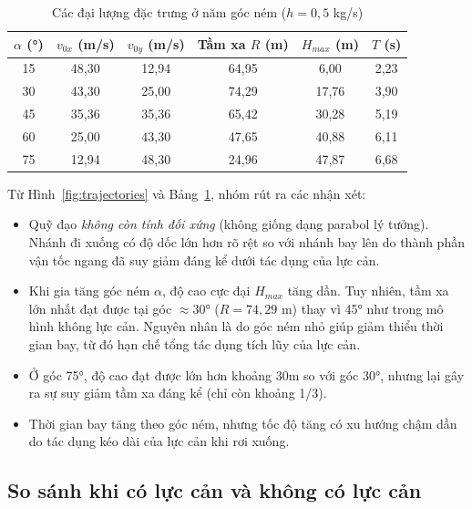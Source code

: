 \begin{table}[H]
\centering
\caption{Các đại lượng đặc trưng ở năm góc ném ($h = 0{,}5$ kg/s)}
\label{tab:data}
\begin{tabular}{|c|c|c|c|c|c|}
\hline
$\alpha$ (°) & $v_{0x}$ (m/s) & $v_{0y}$ (m/s) & Tầm xa $R$ (m) & $H_{max}$ (m) & $T$ (s) \\
\hline
15 & 48{,}30 & 12{,}94 & 64{,}95 & 6{,}00 & 2{,}23 \\
30 & 43{,}30 & 25{,}00 & 74{,}29 & 17{,}76 & 3{,}90 \\
45 & 35{,}36 & 35{,}36 & 65{,}42 & 30{,}28 & 5{,}19 \\
60 & 25{,}00 & 43{,}30 & 47{,}65 & 40{,}88 & 6{,}11 \\
75 & 12{,}94 & 48{,}30 & 24{,}96 & 47{,}87 & 6{,}68 \\
\hline
\end{tabular}
\end{table}

Từ Hình~\ref{fig:trajectories} và Bảng~\ref{tab:data}, nhóm rút ra các nhận xét:

\begin{itemize}
    \item Quỹ đạo \textit{không còn tính đối xứng} (không giống dạng parabol lý tưởng). Nhánh đi xuống có độ dốc lớn hơn rõ rệt so với nhánh bay lên do thành phần vận tốc ngang đã suy giảm đáng kể dưới tác dụng của lực cản.
    
    \item Khi gia tăng góc ném $\alpha$, độ cao cực đại $H_{max}$ tăng dần. Tuy nhiên, tầm xa lớn nhất đạt được tại góc $\approx 30°$ ($R = 74{,}29$ m) thay vì 45° như trong mô hình không lực cản. Nguyên nhân là do góc ném nhỏ giúp giảm thiểu thời gian bay, từ đó hạn chế tổng tác dụng tích lũy của lực cản.
    
    \item Ở góc 75°, độ cao đạt được lớn hơn khoảng 30m so với góc 30°, nhưng lại gây ra sự suy giảm tầm xa đáng kể (chỉ còn khoảng 1/3).
    
    \item Thời gian bay tăng theo góc ném, nhưng tốc độ tăng có xu hướng chậm dần do tác dụng kéo dài của lực cản khi rơi xuống.
\end{itemize}


\subsection{So sánh khi có lực cản và không có lực cản}

